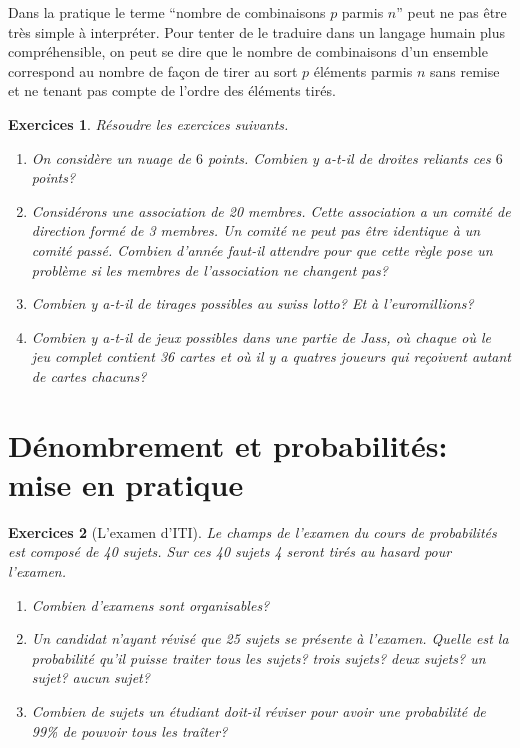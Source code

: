 \documentclass[a4paper,12pt]{book}
\newtheorem*{exercices}{Exercices}
\begin{document}
Dans la pratique le terme ``nombre de combinaisons $p$ parmis $n$'' peut ne pas être très simple à interpréter. Pour tenter de le traduire
dans un langage humain plus compréhensible, on peut se dire que le nombre de combinaisons d'un ensemble correspond au nombre de façon de tirer au sort $p$ éléments parmis $n$
sans remise et ne tenant pas compte de l'ordre des éléments tirés.
\begin{exercices}
 Résoudre les exercices suivants.
 \begin{enumerate}
  \item On considère un nuage de $6$ points. Combien y a-t-il de droites reliants ces $6$ points?
  \item Considérons une association de 20 membres. Cette association a un comité de direction formé de 3 membres. Un comité ne peut pas être identique à un comité passé. Combien d'année faut-il attendre pour que cette règle pose un problème si les membres de l'association ne changent pas?
  \item Combien y a-t-il de tirages possibles au swiss lotto? Et à l'euromillions?
  \item Combien y a-t-il de jeux possibles dans une partie de Jass, où chaque où le jeu complet contient 36 cartes et où il y a quatres joueurs qui reçoivent autant de cartes chacuns?
 \end{enumerate}
\end{exercices}

\section{Dénombrement et probabilités: mise en pratique}

\begin{exercices}[L'examen d'ITI]
Le champs de l'examen du cours de probabilités est composé de 40 sujets. 
Sur ces 40 sujets 4 seront tirés au hasard pour l'examen.
 \begin{enumerate}
  \item Combien d'examens sont organisables?
  \item Un candidat n'ayant révisé que 25 sujets se présente à l'examen. Quelle est la probabilité qu'il puisse traiter tous les sujets? trois sujets? deux sujets? un sujet? aucun sujet?
  \item Combien de sujets un étudiant doit-il réviser pour avoir une probabilité de 99\% de pouvoir tous les traîter?
 \end{enumerate}
\end{exercices}
\end{document}
